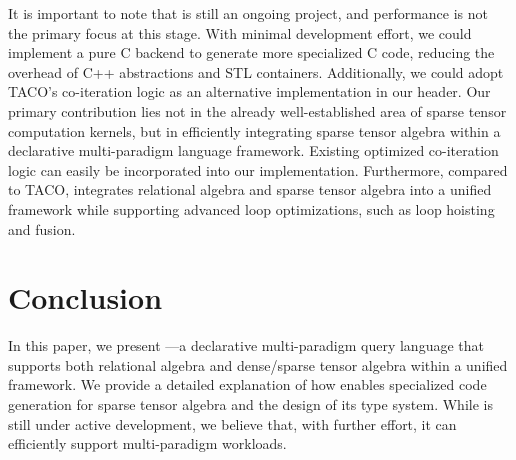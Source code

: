 \documentclass[acmsmall,nonacm]{acmart}\settopmatter{printfolios=true,printccs=false,printacmref=false}
\newcommand{\rhyme}{\text{Rhyme}\xspace}
\begin{document}
It is important to note that \rhyme is still an ongoing project, and performance is not the primary focus at this stage. With minimal development effort, we could implement a pure C backend to generate more specialized C code, reducing the overhead of C++ abstractions and STL containers. Additionally, we could adopt TACO's co-iteration logic as an alternative implementation in our header. Our primary contribution lies not in the already well-established area of sparse tensor computation kernels, but in efficiently integrating sparse tensor algebra within a declarative multi-paradigm language framework. Existing optimized co-iteration logic can easily be incorporated into our implementation. Furthermore, compared to TACO, \rhyme integrates relational algebra and sparse tensor algebra into a unified framework while supporting advanced loop optimizations, such as loop hoisting and fusion.
\section{Conclusion}\label{conclusion}

In this paper, we present \rhyme—a declarative multi-paradigm query language that supports both relational algebra and dense/sparse tensor algebra within a unified framework. We provide a detailed explanation of how \rhyme enables specialized code generation for sparse tensor algebra and the design of its type system. While \rhyme is still under active development, we believe that, with further effort, it can efficiently support multi-paradigm workloads.


\end{document}

